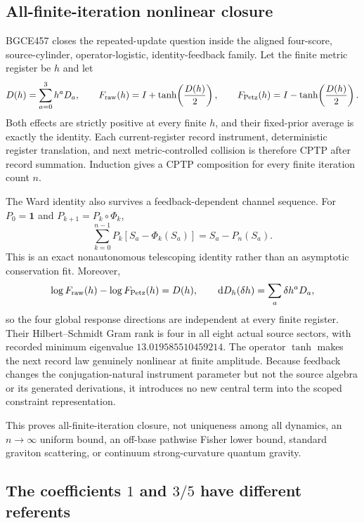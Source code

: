 \documentclass[11pt]{article}
\theoremstyle{definition}
\theoremstyle{remark}
\newcommand{\id}{\mathbf{1}}
\begin{document}
\subsection{All-finite-iteration nonlinear closure}

BGCE457 closes the repeated-update question inside the aligned four-score, source-cylinder, operator-logistic, identity-feedback family. Let the finite metric register be $h$ and let
\begin{equation}
 D(h)=\sum_{a=0}^{3}h^aD_a,
 \qquad
 F_{\rm raw}(h)=I+\tanh\!\left(\frac{D(h)}2\right),
 \qquad
 F_{\rm Petz}(h)=I-\tanh\!\left(\frac{D(h)}2\right).
\end{equation}
Both effects are strictly positive at every finite $h$, and their fixed-prior average is exactly the identity. Each current-register record instrument, deterministic register translation, and next metric-controlled collision is therefore CPTP after record summation. Induction gives a CPTP composition for every finite iteration count $n$.

The Ward identity also survives a feedback-dependent channel sequence. For $P_0=\id$ and $P_{k+1}=P_k\circ\Phi_k$,
\begin{equation}\label{eq:nonautonomousward09}
 \sum_{k=0}^{n-1}P_k\!\left[S_a-\Phi_k(S_a)\right]
 =S_a-P_n(S_a).
\end{equation}
This is an exact nonautonomous telescoping identity rather than an asymptotic conservation fit. Moreover,
\begin{equation}
 \log F_{\rm raw}(h)-\log F_{\rm Petz}(h)=D(h),
 \qquad
 \mathrm dD_h(\delta h)=\sum_a\delta h^aD_a,
\end{equation}
so the four global response directions are independent at every finite register. Their Hilbert--Schmidt Gram rank is four in all eight actual source sectors, with recorded minimum eigenvalue $13.019585510459214$. The operator $\tanh$ makes the next record law genuinely nonlinear at finite amplitude. Because feedback changes the conjugation-natural instrument parameter but not the source algebra or its generated derivations, it introduces no new central term into the scoped constraint representation.

This proves all-finite-iteration closure, not uniqueness among all dynamics, an $n\to\infty$ uniform bound, an off-base pathwise Fisher lower bound, standard graviton scattering, or continuum strong-curvature quantum gravity.

\subsection{The coefficients $1$ and $3/5$ have different referents}
\end{document}
